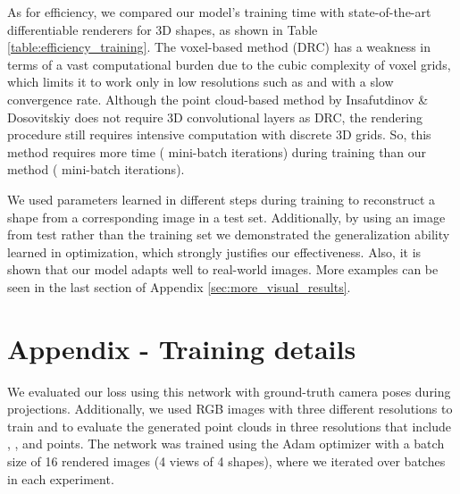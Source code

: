 \documentclass[runningheads]{llncs}
\begin{document}
\begin{table}[h]
\centering
\caption{Ablation studies in terms of Chamfer's distance (CD).}  
   \label{tbl:ablation}
\end{table}


As for efficiency, we compared our model's training time with state-of-the-art differentiable renderers for 3D shapes, as shown in Table \ref{table:efficiency_training}. The voxel-based method (DRC) has a weakness in terms of a vast computational burden due to the cubic complexity of voxel grids, which limits it to work only in low resolutions such as  and  with a slow convergence rate. Although the point cloud-based method by Insafutdinov \& Dosovitskiy \cite{DBLP:journals/corr/abs-1810-09381} does not require 3D convolutional layers as DRC, the rendering procedure still requires intensive computation with discrete 3D grids. So, this method requires more time ( mini-batch iterations) during training than our method ( mini-batch iterations).

We used parameters learned in different steps during training to reconstruct a shape from a corresponding image in a test set. Additionally, by using an image from test rather than the training set we demonstrated the generalization ability learned in optimization, which strongly justifies our effectiveness. Also, it is shown that our model adapts well to real-world images. More examples can be seen in the last section of Appendix \textcolor{blue}{\ref{sec:more_visual_results}}.

\section{Appendix - Training details}
We evaluated our loss using this network with ground-truth camera poses during projections. Additionally, we used RGB images with three different resolutions to train and to evaluate the generated point clouds in three resolutions that include , , and  points. The network was trained using the Adam optimizer with a batch size of 16 rendered images (4 views of 4 shapes), where we iterated over  batches in each experiment.
\end{document}
